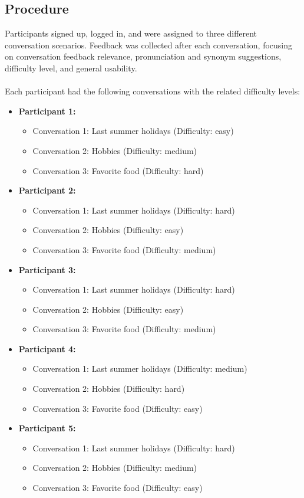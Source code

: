 \documentclass{article}
\begin{document}
\subsection{Procedure}
Participants signed up, logged in, and were assigned to three different conversation scenarios. Feedback was collected after each conversation, focusing on conversation feedback relevance, pronunciation and synonym suggestions, difficulty level, and general usability.
\\\\
Each participant had the following conversations with the related difficulty levels:
\begin{itemize}
    \item \textbf{Participant 1:}
    \begin{itemize}
        \item Conversation 1: Last summer holidays (Difficulty: easy)
        \item Conversation 2: Hobbies (Difficulty: medium)
        \item Conversation 3: Favorite food (Difficulty: hard)
    \end{itemize}
    \item \textbf{Participant 2:}
    \begin{itemize}
        \item Conversation 1: Last summer holidays (Difficulty: hard)
        \item Conversation 2: Hobbies (Difficulty: easy)
        \item Conversation 3: Favorite food (Difficulty: medium)
    \end{itemize}
    \item \textbf{Participant 3:}
    \begin{itemize}
        \item Conversation 1: Last summer holidays (Difficulty: hard)
        \item Conversation 2: Hobbies (Difficulty: easy)
        \item Conversation 3: Favorite food (Difficulty: medium)
    \end{itemize}
    \item \textbf{Participant 4:}
    \begin{itemize}
        \item Conversation 1: Last summer holidays (Difficulty: medium)
        \item Conversation 2: Hobbies (Difficulty: hard)
        \item Conversation 3: Favorite food (Difficulty: easy)
    \end{itemize}
        \item \textbf{Participant 5:}
    \begin{itemize}
        \item Conversation 1: Last summer holidays (Difficulty: hard)
        \item Conversation 2: Hobbies (Difficulty: medium)
        \item Conversation 3: Favorite food (Difficulty: easy)

    \end{itemize}
\end{itemize}
\end{document}
